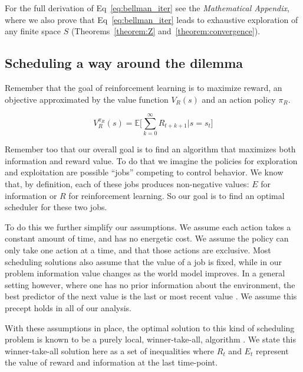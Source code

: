 \documentclass[9pt,twocolumn,twoside]{pnas-new}
\begin{document}
For the full derivation of Eq~\ref{eq:bellman_iter} see the \textit{Mathematical Appendix}, where we also prove that Eq~\ref{eq:bellman_iter} leads to exhaustive exploration of any finite space $S$ (Theorems~\ref{theorem:Z} and~\ref{theorem:convergence}).


\subsection*{Scheduling a way around the dilemma} Remember that the goal of reinforcement learning is to maximize reward, an objective approximated by the value function $V_R(s)$ and an action policy $\pi_R$. 

\begin{equation}\label{eq:V_R} 
	V^{\pi_R}_R(s) = \mathbb{E} \Big [ \sum_{k=0}^{\infty} R_{t+k+1} \big | s = s_t \Big ]
\end{equation}

Remember too that our overall goal is to find an algorithm that maximizes both information and reward value. To do that we imagine the policies for exploration and exploitation are possible ``jobs'' competing to control behavior. We know that, by definition, each of these jobs produces non-negative values: $E$ for information or $R$ for reinforcement learning. So our goal is to find an optimal scheduler for these two jobs. 

To do this we further simplify our assumptions. We assume each action takes a constant amount of time, and has no energetic cost. We assume the policy can only take one action at a time, and that those actions are exclusive. Most scheduling solutions also assume that the value of a job is fixed, while in our problem information value changes as the world model improves. In a general setting however, where one has no prior information about the environment, the best predictor of the next value is the last or most recent value \cite{Hocker2019,Roughgarden2019}. We assume this precept holds in all of our analysis.

With these assumptions in place, the optimal solution to this kind of scheduling problem is known to be a purely local, winner-take-all, algorithm \cite{Bellmann1954,Roughgarden2019}. We state this winner-take-all solution here as a set of inequalities where $R_t$ and $E_t$ represent the value of reward and information at the last time-point.
\end{document}
